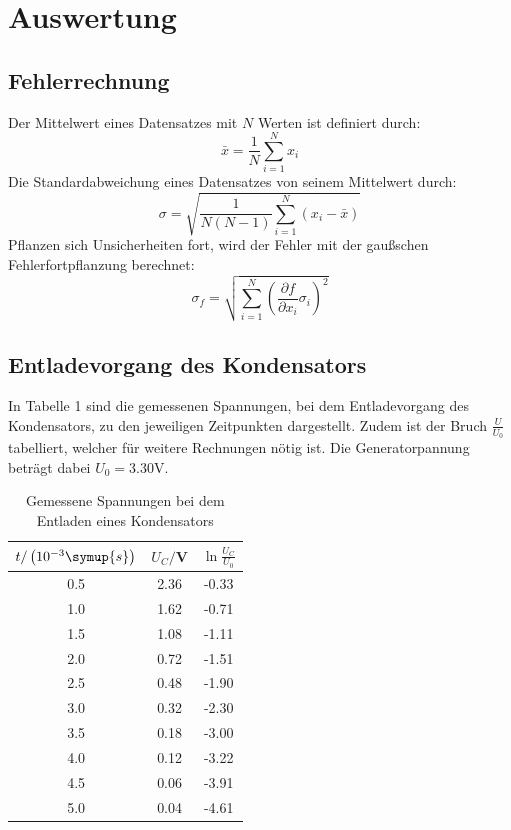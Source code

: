 \section{Auswertung}
\label{sec:Auswertung}

\subsection{Fehlerrechnung}
Der Mittelwert eines Datensatzes mit $N$ Werten ist definiert durch:
\begin{equation}
  \bar{x} = \frac{1}{N} \sum_{i=1}^N x_i
\end{equation}
Die Standardabweichung eines Datensatzes von seinem Mittelwert durch:
\begin{equation}
  \sigma = \sqrt{\frac{1}{N(N-1)} \sum_{i=1}^N (x_i - \bar{x})}
\end{equation}
Pflanzen sich Unsicherheiten fort, wird der Fehler mit der gaußschen
Fehlerfortpflanzung berechnet:
\begin{equation}
  \sigma_f = \sqrt{
      \sum\limits_{i = 1}^N
       \left( \frac{\partial f}{\partial x_i} \sigma_i \right)^{\!\! 2}
     }
\end{equation}


\subsection{Entladevorgang des Kondensators}
In Tabelle 1 sind die gemessenen Spannungen, bei dem Entladevorgang des Kondensators, zu den jeweiligen Zeitpunkten dargestellt. Zudem
ist der Bruch $\frac{U}{U_0}$ tabelliert, welcher für weitere Rechnungen nötig ist. Die Generatorpannung beträgt
dabei $U_0 = 3.30$V.

\begin{table}[H]
  \centering
  \caption{Gemessene Spannungen bei dem Entladen eines Kondensators}
  \label{tab:Rechteckspannung}
  \begin{tabular}{c c c}
    \toprule
    $t/\left(10^{-3}\symup{s}\right)$ & $U_C/$V & $\ln{\frac{U_C}{U_0}}$ \\
    \midrule
    0.5 & 2.36 & -0.33 \\
    1.0 & 1.62 & -0.71 \\
    1.5 & 1.08 & -1.11 \\
    2.0 & 0.72 & -1.51 \\
    2.5 & 0.48 & -1.90 \\
    3.0 & 0.32 & -2.30 \\
    3.5 & 0.18 & -3.00 \\
    4.0 & 0.12 & -3.22 \\
    4.5 & 0.06 & -3.91 \\
    5.0 & 0.04 & -4.61 \\
    \bottomrule
  \end{tabular}
\end{table}


